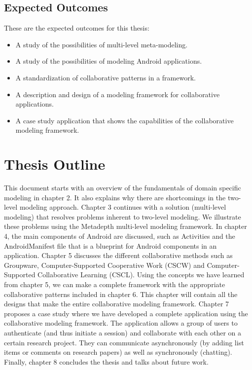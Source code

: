 \subsection{Expected Outcomes}

These are the expected outcomes for this thesis:

\begin{itemize}
\item{A study of the possibilities of multi-level meta-modeling.}
\item{A study of the possibilities of modeling Android applications.}
\item{A standardization of collaborative patterns in a framework.}
\item{A description and design of a modeling framework for collaborative applications.}
\item{A case study application that shows the capabilities of the collaborative modeling framework.}
\end{itemize}

\section{Thesis Outline}

This document starts with an overview of the fundamentals of domain specific modeling in chapter 2. It also explains why there are shortcomings in the two-level modeling approach. Chapter 3 continues with a solution (multi-level modeling) that resolves problems inherent to two-level modeling. We illustrate these problems using the Metadepth multi-level modeling framework. In chapter 4, the main components of Android are discussed, such as Activities and the AndroidManifest file that is a blueprint for Android components in an application. Chapter 5 discusses the different collaborative methods such as Groupware, Computer-Supported Cooperative Work (CSCW) and Computer-Supported Collaborative Learning (CSCL). Using the concepts we have learned from chapter 5, we can make a complete framework with the appropriate collaborative patterns included in chapter 6. This chapter will contain all the designs that make the entire collaborative modeling framework. Chapter 7 proposes a case study where we have developed a complete application using the collaborative modeling framework. The application allows a group of users to authenticate (and thus initiate a session) and collaborate with each other on a certain research project. They can communicate asynchronously (by adding list items or comments on research papers) as well as synchronously (chatting). Finally, chapter 8 concludes the thesis and talks about future work.
